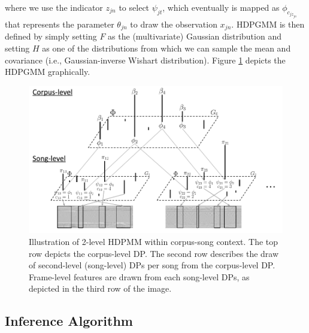 \documentclass{article}
\begin{document}
where we use the indicator $z_{jn}$ to select $\psi_{jt}$, which eventually is mapped as $\phi_{c_{jz_{jn}}}$ that represents the parameter $\theta_{jn}$ to draw the observation $x_{jn}$. HDPGMM is then defined by simply setting $F$ as the (multivariate) Gaussian distribution and setting $H$ as one of the distributions from which we can sample the mean and covariance (i.e., Gaussian-inverse Wishart distribution). Figure \ref{fig:hdpmm} depicts the HDPGMM graphically.
\begin{figure}[ht]
    \centering
    \includegraphics[width=\linewidth]{figs/HDP-stick-breaking.pdf}
    \caption{Illustration of 2-level HDPMM within corpus-song context. The top row depicts the corpus-level DP. The second row describes the draw of second-level (song-level) DPs per song from the corpus-level DP. Frame-level features are drawn from each song-level DPs, as depicted in the third row of the image.}
    \vspace{-0.4cm}
    \label{fig:hdpmm}
\end{figure}


\subsection{Inference Algorithm}\label{sec:hdpgmm:inference}
\end{document}
